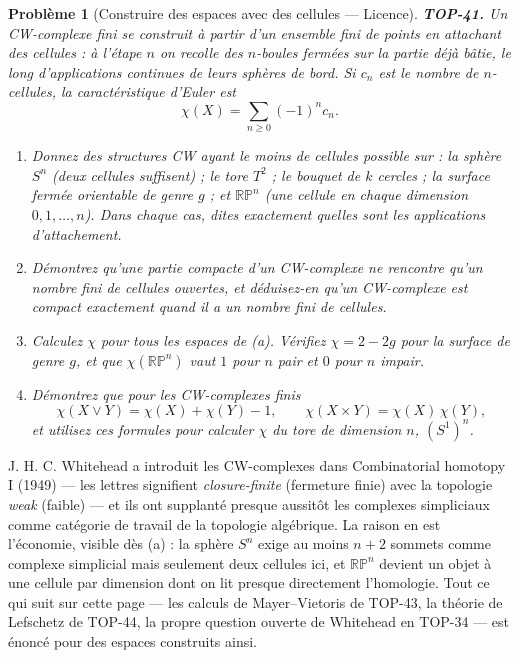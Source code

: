 \documentclass[11pt]{article}
\newtheorem{problem}{Problème}
\begin{document}
\bigskip

\begin{problem}[{Construire des espaces avec des cellules --- Licence}]
\textbf{TOP-41.} Un \textit{CW-complexe} fini se construit à partir d'un ensemble fini de points en
attachant des cellules : à l'étape $ n $ on recolle des $ n $-boules fermées sur la partie déjà
bâtie, le long d'applications continues de leurs sphères de bord. Si $ c_n $ est le nombre de
$ n $-cellules, la caractéristique d'Euler est
\[ \chi(X) = \sum_{n \ge 0} (-1)^n c_n . \]
\begin{enumerate}
\item[(a)] Donnez des structures CW ayant le moins de cellules possible sur : la sphère $ S^n $ (deux
cellules suffisent) ; le tore $ T^2 $ ; le bouquet de $ k $ cercles ; la surface fermée orientable
de genre $ g $ ; et $ \mathbb{RP}^n $ (une cellule en chaque dimension $ 0, 1, \ldots, n $). Dans
chaque cas, dites exactement quelles sont les applications d'attachement.
\item[(b)] Démontrez qu'une partie compacte d'un CW-complexe ne rencontre qu'un nombre fini de cellules
ouvertes, et déduisez-en qu'un CW-complexe est compact exactement quand il a un nombre fini de
cellules.
\item[(c)] Calculez $ \chi $ pour tous les espaces de (a). Vérifiez $ \chi = 2 - 2g $ pour la surface de
genre $ g $, et que $ \chi(\mathbb{RP}^n) $ vaut $ 1 $ pour $ n $ pair et $ 0 $ pour $ n $
impair.
\item[(d)] Démontrez que pour les CW-complexes finis
\[ \chi(X \vee Y) = \chi(X) + \chi(Y) - 1 , \qquad \chi(X \times Y) = \chi(X)\,\chi(Y) , \]
et utilisez ces formules pour calculer $ \chi $ du tore de dimension $ n $, $ (S^1)^n $.
\end{enumerate}

\end{problem}

\noindent J. H. C. Whitehead a introduit les CW-complexes dans \og{} Combinatorial homotopy I \fg{}
(1949) --- les lettres signifient \textit{closure-finite} (fermeture finie) avec la topologie \textit{weak}
(faible) --- et ils ont supplanté presque aussitôt les complexes simpliciaux comme catégorie de travail de
la topologie algébrique. La raison en est l'économie, visible dès (a) : la sphère $ S^n $ exige au moins
$ n + 2 $ sommets comme complexe simplicial mais seulement deux cellules ici, et $ \mathbb{RP}^n $
devient un objet à une cellule par dimension dont on lit presque directement l'homologie. Tout ce qui suit
sur cette page --- les calculs de Mayer--Vietoris de TOP-43, la théorie de Lefschetz de TOP-44, la propre
question ouverte de Whitehead en TOP-34 --- est énoncé pour des espaces construits ainsi.
\end{document}
